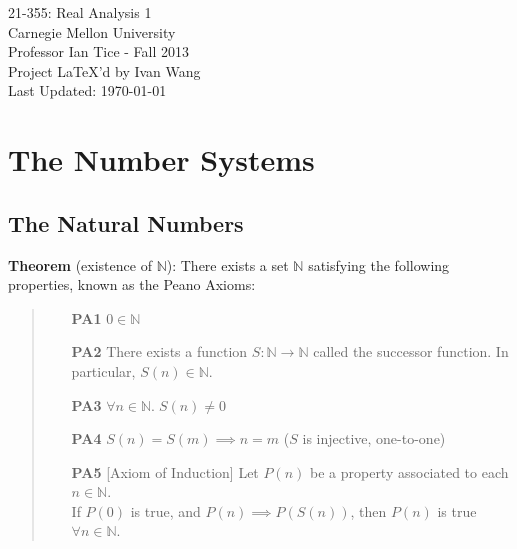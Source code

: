 \documentclass[11pt]{article}
\begin{document}
\begin{titlepage}
	\vspace*{\fill}
	\begin{center}
		{\Huge 21-355: Real Analysis 1}\\[0.5cm]
		{\Large Carnegie Mellon University}\\[0.3cm]
		{\Large Professor Ian Tice - Fall 2013}\\[2cm]
		Project \LaTeX'd by Ivan Wang\\[0.2cm]
		Last Updated: \today
	\end{center}
	\vspace*{\fill}
\end{titlepage}

\newpage

\tableofcontents
\newpage

\section{The Number Systems}

\subsection{The Natural Numbers}

\textbf{Theorem} (existence of $\mathbb{N}$): There exists a set $\mathbb{N}$ satisfying the following properties, known as the Peano Axioms:
\begin{quote}
	\begin{enumerate}
	\item[\bf PA1] $0 \in \mathbb{N}$
	
	\item [\bf PA2] There exists a function $S: \mathbb{N} \to \mathbb{N}$ called the successor function. In particular, $S(n) \in \mathbb{N}$.
	
	\item[\bf PA3] $\forall n \in \mathbb{N}.\; S(n) \neq 0$
	
	\item[\bf PA4] $S(n) = S(m) \implies n = m$ ($S$ is injective, one-to-one)

	\item[\bf PA5] [Axiom of Induction] Let $P(n)$ be a property associated to each $n \in \mathbb{N}$.\\
	If $P(0)$ is true, and $P(n) \implies P(S(n))$, then $P(n)$ is true $\forall n \in \mathbb{N}$.
	\end{enumerate}
\end{quote}
\end{document}
